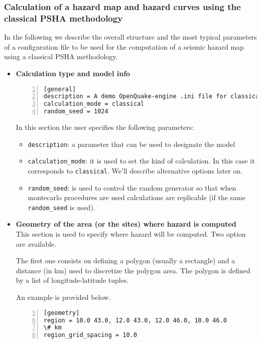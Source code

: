 \subsubsection[Calculation of a hazard map and hazard curves using 
    classical PSHA]{Calculation of a hazard map and hazard curves using 
    the classical PSHA methodology}
\label{sec:config_classical_PSHA}
%
In the following we describe the overall structure and the
most typical parameters of a configuration file to be used for the 
computation of a seismic hazard map using a classical PSHA methodology.
\begin{itemize}
\item \textbf{Calculation type and model info}
\begin{Verbatim}[frame=single, commandchars=\\\{\}, fontsize=\small,
    numbers=left, numbersep=2pt]
[general]
description = A demo OpenQuake-engine .ini file for classical PSHA
calculation_mode = classical
random_seed = 1024
\end{Verbatim}
In this section the user specifies the following parameters:
\begin{itemize}
    \item \texttt{description}: a parameter that can be used to designate 
        the model 
    \item \texttt{calculation\_mode}: it is used to set the kind 
        of calculation. In this case it corresponds to \texttt{classical}.
        We'll describe alternative options later on.
    \item \texttt{random\_seed}: is used to control the random generator 
        so that when montecarlo procedures are used calculations are 
        replicable (if the same \texttt{random\_seed} is used).
\end{itemize}
%
\item \textbf{Geometry of the area (or the sites) where hazard is computed}
    \hfill \\
This section is used to specify where hazard will be computed. Two 
option are available. 

The first one consists on defining a polygon 
(usually a rectangle) and a distance (in km) used to discretize the 
polygon area. The polygon is defined by a list of longitude-latitude tuples.

An example is provided below.
\begin{Verbatim}[frame=single, commandchars=\\\{\}, fontsize=\small,
    firstnumber=5, numbers=left, numbersep=2pt]
[geometry]
region = 10.0 43.0, 12.0 43.0, 12.0 46.0, 10.0 46.0
\# km
region_grid_spacing = 10.0
\end{Verbatim}


\end{itemize}
